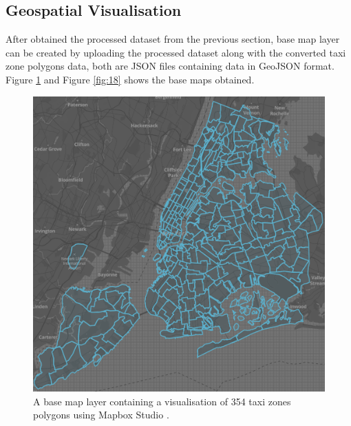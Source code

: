 \documentclass[11pt,a4paper]{article}
\begin{document}
\subsection{Geospatial Visualisation}
After obtained the processed dataset from the previous section, base map layer can be created by uploading the processed dataset along with the converted taxi zone polygons data, both are JSON files containing data in GeoJSON format. Figure \ref{fig:17} and Figure \ref{fig:18} shows the base maps obtained.

\begin{figure}[H]
	\centering
	\includegraphics[width=\textwidth,keepaspectratio]{figures/fig17.png}
	\caption{\label{fig:17}A base map layer containing a visualisation of 354 taxi zones polygons using Mapbox Studio \parencite{Mapbox2017}. }
\end{figure}
\end{document}
